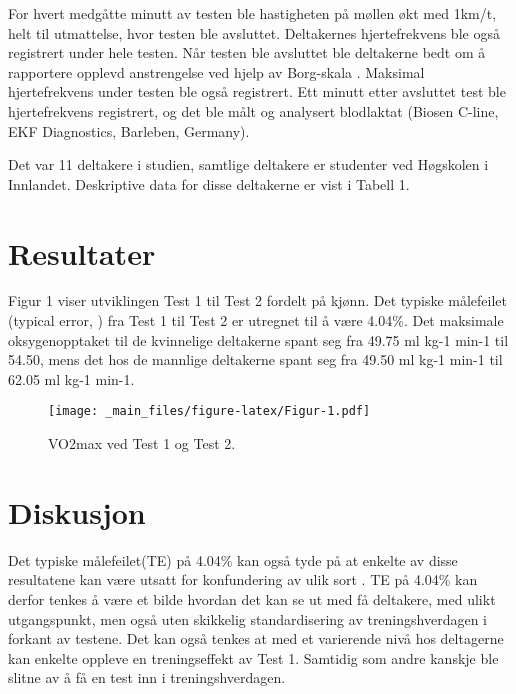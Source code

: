 \documentclass[
]{book}
\begin{document}
For hvert medgåtte minutt av testen ble hastigheten på møllen økt med 1km/t, helt til utmattelse, hvor testen ble avsluttet. Deltakernes hjertefrekvens ble også registrert under hele testen. Når testen ble avsluttet ble deltakerne bedt om å rapportere opplevd anstrengelse ved hjelp av Borg-skala \citep{borg1982}. Maksimal hjertefrekvens under testen ble også registrert. Ett minutt etter avsluttet test ble hjertefrekvens registrert, og det ble målt og analysert blodlaktat (Biosen C-line, EKF Diagnostics, Barleben, Germany).

Det var 11 deltakere i studien, samtlige deltakere er studenter ved Høgskolen i Innlandet. Deskriptive data for disse deltakerne er vist i Tabell 1.

\hypertarget{resultater}{%
\section{Resultater}\label{resultater}}

Figur 1 viser utviklingen Test 1 til Test 2 fordelt på kjønn. Det typiske målefeilet (typical error, \citep{hopkins2000}) fra Test 1 til Test 2 er utregnet til å være 4.04\%. Det maksimale oksygenopptaket til de kvinnelige deltakerne spant seg fra 49.75 ml kg-1 min-1 til 54.50, mens det hos de mannlige deltakerne spant seg fra 49.50 ml kg-1 min-1 til 62.05 ml kg-1 min-1.

\begin{figure}
\centering
\texttt{[image: \_main\_files/figure-latex/Figur-1.pdf]}
\caption{\label{fig:Figur}VO2max ved Test 1 og Test 2.}
\end{figure}

\hypertarget{diskusjon}{%
\section{Diskusjon}\label{diskusjon}}

Det typiske målefeilet(TE) på 4.04\% kan også tyde på at enkelte av disse resultatene kan være utsatt for konfundering av ulik sort \citep{hopkins2000}. TE på 4.04\% kan derfor tenkes å være et bilde hvordan det kan se ut med få deltakere, med ulikt utgangspunkt, men også uten skikkelig standardisering av treningshverdagen i forkant av testene. Det kan også tenkes at med et varierende nivå hos deltagerne kan enkelte oppleve en treningseffekt av Test 1. Samtidig som andre kanskje ble slitne av å få en test inn i treningshverdagen.
\end{document}
